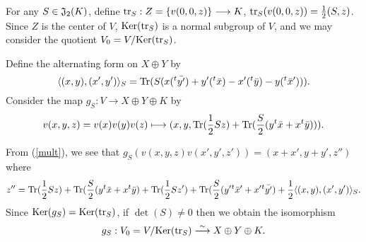 \documentclass[11pt]{amsart}
\numberwithin{equation}{section}
\theoremstyle{definition}
\begin{document}
For any $S\in\frak J_2(K)$, define ${\rm tr}_S: Z=\{v(0,0,z)\}\longrightarrow K$, ${\rm tr}_S(v(0,0,z))={\displaystyle}\frac{1}{2}(S,z)$. Since $Z$ is the center of $V$, 
${\rm Ker}({\rm tr}_S)$ is a normal subgroup of $V$, and we may consider the quotient $V_0=V/{\rm Ker}({\rm tr}_S)$.

Define the alternating form on $X\oplus Y$ by
$$\langle (x,y), (x',y')\rangle_S={\rm Tr}(S ( x({}^t \bar{y'})+y'({}^t {\bar x})-x' ({}^t \bar{y})-y({}^t {\bar x'}))).
$$
Consider the map $g_S: V\longrightarrow X\oplus Y\oplus K$ by
\begin{equation}\label{alt1}
v(x,y,z)=v(x)v(y)v(z)\longmapsto (x,y, {\rm Tr}(\frac{1}{2}Sz)+{\rm Tr}(\frac S2 (y{}^t {\bar x}+ x {}^t \bar{y}))).
\end{equation}

From (\ref{mult}), we see that $g_S(v(x,y,z)v(x',y',z'))= (x+x',y+y',z'')$ 
where 
$$z''= {\rm Tr}(\frac{1}{2}Sz)+{\rm Tr}(\frac S2 (y{}^t {\bar x}+ x{}^t \bar{y})+{\rm Tr}(\frac{1}{2}Sz')+ 
{\rm Tr}(\frac S2(y'{}^t {\bar x'}+x'{}^t \bar{y'})
+ \frac 12 \langle (x,y), (x',y')\rangle_S.$$
Since ${\rm Ker}(g_S)={\rm Ker}({\rm tr}_S)$, if $\det(S)\not=0$ then we obtain the isomorphism
\begin{equation}\label{heisenberg1}
g_S: V_0=V/{\rm Ker}({\rm tr}_S)\stackrel{\sim}{\longrightarrow} X\oplus Y\oplus K.
\end{equation}
\end{document}

